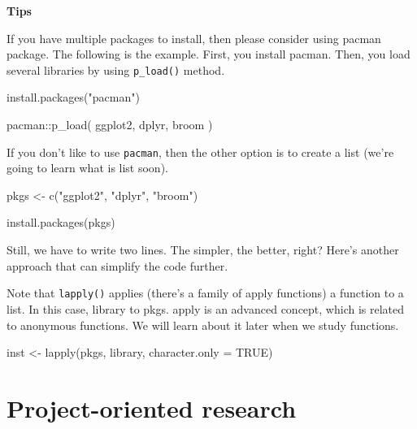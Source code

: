 \documentclass[
]{book}
\newenvironment{Shaded}{\begin{snugshade}}{\end{snugshade}}
\newcommand{\AttributeTok}[1]{\textcolor[rgb]{0.77,0.63,0.00}{#1}}
\newcommand{\ConstantTok}[1]{\textcolor[rgb]{0.00,0.00,0.00}{#1}}
\newcommand{\FunctionTok}[1]{\textcolor[rgb]{0.00,0.00,0.00}{#1}}
\newcommand{\NormalTok}[1]{#1}
\newcommand{\OtherTok}[1]{\textcolor[rgb]{0.56,0.35,0.01}{#1}}
\newcommand{\SpecialCharTok}[1]{\textcolor[rgb]{0.00,0.00,0.00}{#1}}
\newcommand{\StringTok}[1]{\textcolor[rgb]{0.31,0.60,0.02}{#1}}
\begin{document}
\textbf{Tips}

If you have multiple packages to install, then please consider using pacman package. The following is the example. First, you install pacman. Then, you load several libraries by using \texttt{p\_load()} method.

\begin{Shaded}
\begin{Highlighting}[]
\FunctionTok{install.packages}\NormalTok{(}\StringTok{"pacman"}\NormalTok{)}

\NormalTok{pacman}\SpecialCharTok{::}\FunctionTok{p\_load}\NormalTok{(}
\NormalTok{  ggplot2,}
\NormalTok{  dplyr, }
\NormalTok{  broom}
\NormalTok{)}
\end{Highlighting}
\end{Shaded}

If you don't like to use \texttt{pacman}, then the other option is to create a list (we're going to learn what is list soon).

\begin{Shaded}
\begin{Highlighting}[]
\NormalTok{pkgs }\OtherTok{\textless{}{-}} \FunctionTok{c}\NormalTok{(}\StringTok{"ggplot2"}\NormalTok{, }\StringTok{"dplyr"}\NormalTok{, }\StringTok{"broom"}\NormalTok{)}

\FunctionTok{install.packages}\NormalTok{(pkgs)}
\end{Highlighting}
\end{Shaded}

Still, we have to write two lines. The simpler, the better, right? Here's another approach that can simplify the code further.

Note that \texttt{lapply()} applies (there's a family of apply functions) a function to a list. In this case, library to pkgs. apply is an advanced concept, which is related to anonymous functions. We will learn about it later when we study functions.

\begin{Shaded}
\begin{Highlighting}[]
\NormalTok{inst }\OtherTok{\textless{}{-}} \FunctionTok{lapply}\NormalTok{(pkgs, library, }
               \AttributeTok{character.only =} \ConstantTok{TRUE}\NormalTok{)}
\end{Highlighting}
\end{Shaded}

\hypertarget{project-oriented-research}{%
\section{Project-oriented research}\label{project-oriented-research}}
\end{document}
